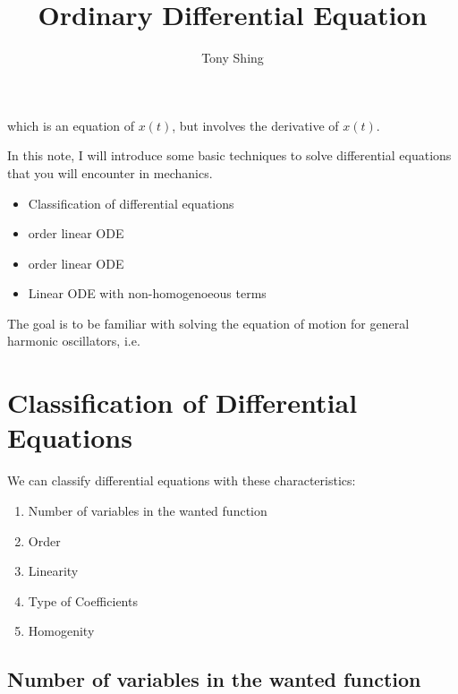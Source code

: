 \documentclass[class=article, crop=false, 12pt]{standalone}
\author{Tony Shing}
\title{Ordinary Differential Equation}
\begin{document}
\maketitle


\begin{overview}
    \begin{center}
        which is an equation of $x(t)$, but involves the  derivative of $x(t)$.
    \end{center}
    
    In this note, I will introduce some basic techniques to solve differential equations
    that you will encounter in mechanics. 
    \begin{itemize}
        \item Classification of differential equations
        \item {} order linear ODE
        \item {} order linear ODE
        \item Linear ODE with non-homogenoeous terms
    \end{itemize}

    The goal is to be familiar with solving the equation of motion for general harmonic oscillators, i.e.
\end{overview}


\section{Classification of Differential Equations}

We can classify differential equations with these characteristics:
\begin{enumerate}
    \item Number of variables in the wanted function
    \item Order
    \item Linearity
    \item Type of Coefficients
    \item Homogenity
\end{enumerate}

\newpage
\subsection{Number of variables in the wanted function}
\end{document}
